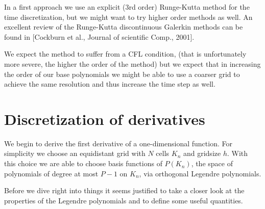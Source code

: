 \documentclass[a4paper,12pt]{scrartcl}
\begin{document}
In a first approach we use an explicit (3rd order) Runge-Kutta method for 
the time discretization, but we might want to try higher order methods as well.   
An excellent review of the Runge-Kutta discontinuous Galerkin methods can be found in [Cockburn et al., Journal of scientific Comp., 2001]. 

We expect the method to suffer from a CFL condition, (that is unfortunately more severe, the 
higher the order of the method) but we expect that in increasing the order of 
our base polynomials we might be able to use a coarser grid to achieve the same resolution 
and thus increase the time step as well. 




\section{ Discretization of derivatives}
We begin to derive the first derivative of a one-dimensional function.
For simplicity we choose an equidistant grid with $N$ cells $K_n$ and gridsize $h$.
With this choice we are able to choose basis functions of $P(K_n)$, the space of 
polynomials of degree at most $P-1$ on $K_n$, via orthogonal Legendre polynomials. 

Before we dive right into things it seems justified to take a closer look at the 
properties of the Legendre polynomials and to define some useful quantities.
\end{document}

